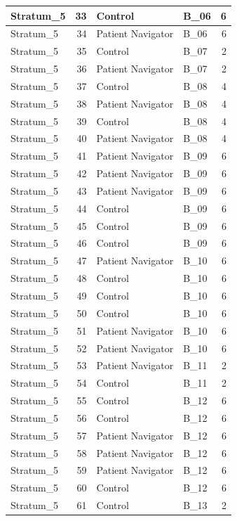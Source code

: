 \documentclass[
]{book}
\begin{document}
\begin{table}[H]
\begin{tabular}{l|r|l|l|r}
\hline
Stratum\_5 & 33 & Control & B\_06 & 6\\
\hline
Stratum\_5 & 34 & Patient Navigator & B\_06 & 6\\
\hline
Stratum\_5 & 35 & Control & B\_07 & 2\\
\hline
Stratum\_5 & 36 & Patient Navigator & B\_07 & 2\\
\hline
Stratum\_5 & 37 & Control & B\_08 & 4\\
\hline
Stratum\_5 & 38 & Patient Navigator & B\_08 & 4\\
\hline
Stratum\_5 & 39 & Control & B\_08 & 4\\
\hline
Stratum\_5 & 40 & Patient Navigator & B\_08 & 4\\
\hline
Stratum\_5 & 41 & Patient Navigator & B\_09 & 6\\
\hline
Stratum\_5 & 42 & Patient Navigator & B\_09 & 6\\
\hline
Stratum\_5 & 43 & Patient Navigator & B\_09 & 6\\
\hline
Stratum\_5 & 44 & Control & B\_09 & 6\\
\hline
Stratum\_5 & 45 & Control & B\_09 & 6\\
\hline
Stratum\_5 & 46 & Control & B\_09 & 6\\
\hline
Stratum\_5 & 47 & Patient Navigator & B\_10 & 6\\
\hline
Stratum\_5 & 48 & Control & B\_10 & 6\\
\hline
Stratum\_5 & 49 & Control & B\_10 & 6\\
\hline
Stratum\_5 & 50 & Control & B\_10 & 6\\
\hline
Stratum\_5 & 51 & Patient Navigator & B\_10 & 6\\
\hline
Stratum\_5 & 52 & Patient Navigator & B\_10 & 6\\
\hline
Stratum\_5 & 53 & Patient Navigator & B\_11 & 2\\
\hline
Stratum\_5 & 54 & Control & B\_11 & 2\\
\hline
Stratum\_5 & 55 & Control & B\_12 & 6\\
\hline
Stratum\_5 & 56 & Control & B\_12 & 6\\
\hline
Stratum\_5 & 57 & Patient Navigator & B\_12 & 6\\
\hline
Stratum\_5 & 58 & Patient Navigator & B\_12 & 6\\
\hline
Stratum\_5 & 59 & Patient Navigator & B\_12 & 6\\
\hline
Stratum\_5 & 60 & Control & B\_12 & 6\\
\hline
Stratum\_5 & 61 & Control & B\_13 & 2\\

\end{tabular}
\end{table}
\end{document}

